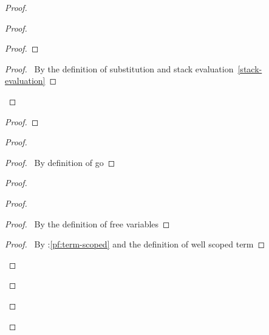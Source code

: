 \documentclass[a4paper]{article}
\begin{document}
\begin{proof}
\begin{proof}
\begin{proof}
    \end{proof}
    \begin{proof}
      \pf\ By the definition of substitution and stack evaluation~\ref{stack-evaluation}
    \end{proof}
  \end{proof}
  \begin{proof}
  \end{proof}
  \begin{proof}
    \begin{proof}
      \pf\ By definition of \textsf{go}
    \end{proof}
     \label{pf:6-2}
    \begin{proof}
      \begin{proof}
        \begin{proof}
          \pf\ By the definition of free variables
        \end{proof}
        \qedstep
        \begin{proof}
          \pf\ By \toplevel:\ref{pf:term-scoped} and the definition of well scoped term

\end{proof}
\end{proof}
\end{proof}
\end{proof}
\end{proof}
\end{document}
